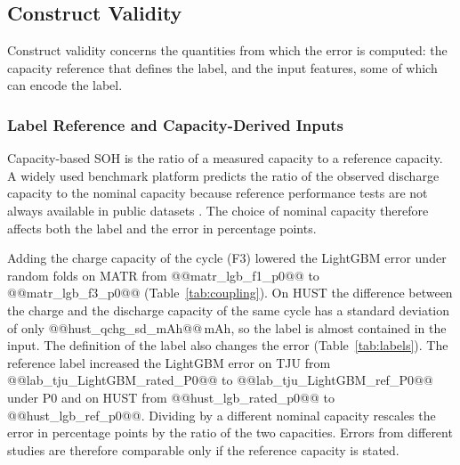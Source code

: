 \documentclass{ieeeaccess}
\newcommand{\fitcol}[1]{\footnotesize\resizebox{\ifdim\width>\columnwidth\columnwidth\else\width\fi}{!}{}}
\begin{document}
\subsection{Construct Validity}
\label{sec:construct}
Construct validity concerns the quantities from which the error is computed: the capacity reference that defines the label, and the input features, some of which can encode the label.

\subsubsection{Label Reference and Capacity-Derived Inputs}
\label{sec:res_label}
Capacity-based SOH is the ratio of a measured capacity to a reference capacity. A widely used benchmark platform predicts the ratio of the observed discharge capacity to the nominal capacity because reference performance tests are not always available in public datasets \cite{zhang2024}. The choice of nominal capacity therefore affects both the label and the error in percentage points.

Adding the charge capacity of the cycle (F3) lowered the LightGBM error under random folds on MATR from @@matr_lgb_f1_p0@@ to @@matr_lgb_f3_p0@@ (Table~\ref{tab:coupling}). On HUST the difference between the charge and the discharge capacity of the same cycle has a standard deviation of only @@hust_qchg_sd_mAh@@\,mAh, so the label is almost contained in the input. The definition of the label also changes the error (Table~\ref{tab:labels}). The reference label increased the LightGBM error on TJU from @@lab_tju_LightGBM_rated_P0@@ to @@lab_tju_LightGBM_ref_P0@@ under P0 and on HUST from @@hust_lgb_rated_p0@@ to @@hust_lgb_ref_p0@@. Dividing by a different nominal capacity rescales the error in percentage points by the ratio of the two capacities. Errors from different studies are therefore comparable only if the reference capacity is stated.
\begin{table}[!tb]
\centering
\caption{RMSE (\% SOH) with F1 (left) and F3 = F1 + charge capacity (right); P3a is leave-one-group-out.}
\label{tab:coupling}
\scriptsize
\fitcol{tables/coupling.tex}
\end{table}
\begin{table}[!tb]
\centering
\caption{RMSE (\% SOH) under the rated label (left) and the reference label (right), fixed hyperparameters, F1.}
\label{tab:labels}
\scriptsize
\fitcol{tables/labels.tex}
\end{table}
\end{document}
